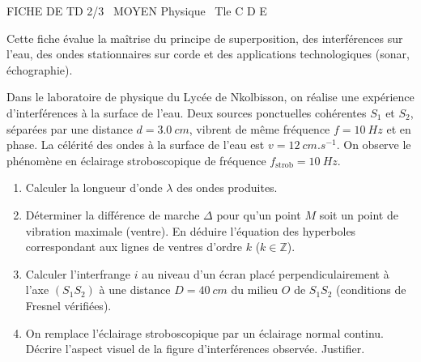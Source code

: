 \documentclass[11pt]{article}
\begin{document}
\begin{tcolorbox}[enhanced,colback=popink,colframe=popink,arc=10pt,boxrule=0pt,left=12pt,right=12pt,top=9pt,bottom=9pt]
{\color{white}\popxbold\small FICHE DE TD 2/3 \textbullet\ MOYEN \hfill Physique \textbullet\ Tle C D E\par}
\end{tcolorbox}
\vspace{4pt}
Cette fiche évalue la maîtrise du principe de superposition, des interférences sur l'eau, des ondes stationnaires sur corde et des applications technologiques (sonar, échographie).

\begin{exercice}
Dans le laboratoire de physique du Lycée de Nkolbisson, on réalise une expérience d'interférences à la surface de l'eau. Deux sources ponctuelles cohérentes $S_1$ et $S_2$, séparées par une distance $d = \SI{3,0}{cm}$, vibrent de même fréquence $f = \SI{10}{Hz}$ et en phase. La célérité des ondes à la surface de l'eau est $v = \SI{12}{cm.s^{-1}}$. On observe le phénomène en éclairage stroboscopique de fréquence $f_{\text{strob}} = \SI{10}{Hz}$.
\begin{enumerate}
    \item Calculer la longueur d'onde $\lambda$ des ondes produites.
    \item Déterminer la différence de marche $\Delta$ pour qu'un point $M$ soit un point de vibration maximale (ventre). En déduire l'équation des hyperboles correspondant aux lignes de ventres d'ordre $k$ ($k \in \mathbb{Z}$).
    \item Calculer l'interfrange $i$ au niveau d'un écran placé perpendiculairement à l'axe $(S_1S_2)$ à une distance $D = \SI{40}{cm}$ du milieu $O$ de $S_1S_2$ (conditions de Fresnel vérifiées).
    \item On remplace l'éclairage stroboscopique par un éclairage normal continu. Décrire l'aspect visuel de la figure d'interférences observée. Justifier.
\end{enumerate}
\end{exercice}
\end{document}
